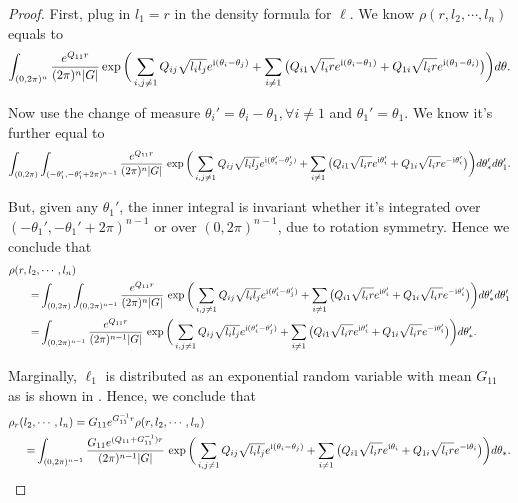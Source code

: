 \documentclass[a4paper, 11pt]{article}
\newcommand{\compi}{\textnormal{i}}
\begin{document}
\begin{proof}
First, plug in $l_1=r$ in the density formula for $\ell$. We know $\rho(r, l_2,\cdots, l_n)$ equals to
\[\int_{(0,2\pi)^n}\frac{e^{Q_{11}r}}{(2\pi)^n|G|} \exp\bigg(\sum_{i,j\neq 1} Q_{ij}\sqrt{l_i l_j}e^{\compi (\theta_i-\theta_j)}
+\sum_{i\neq 1}\big(Q_{i1}\sqrt{l_i r}e^{\compi(\theta_i-\theta_1)}+Q_{1i}\sqrt{l_i r}e^{\compi(\theta_1-\theta_i)}\big)
\bigg)d\theta.
\]

Now use the change of measure $\theta_i'=\theta_i-\theta_1, \forall i\neq 1$ and $\theta_1'=\theta_1$. We know it's further equal to
\[\int_{(0,2\pi)}\int_{(-\theta_1',-\theta_1'+2\pi)^{n-1}}\frac{e^{Q_{11}r}}{(2\pi)^n|G|}\, \exp\bigg(\sum_{i,j\neq 1} Q_{ij}\sqrt{l_i l_j}e^{\compi (\theta_i'-\theta_j')}
+\sum_{i\neq 1}\big(Q_{i1}\sqrt{l_i r}e^{\compi\theta_i'} +Q_{1i}\sqrt{l_i r}e^{-\compi\theta_i'}\big)
\bigg)d\theta_*'d\theta_1'.\]

But, given any $\theta_1'$, the inner integral is invariant whether it's integrated over $(-\theta_1',-\theta_1'+2\pi)^{n-1}$ or over $(0,2\pi)^{n-1}$, due to rotation symmetry. Hence we conclude that
\begin{equation*}
\begin{aligned}
\rho(r,l_2,& \cdots,l_n)\\
=& \int_{(0,2\pi)}\int_{(0,2\pi)^{n-1}}\frac{e^{Q_{11}r}}{(2\pi)^n|G|}\, \exp\bigg(\sum_{i,j\neq 1} Q_{ij}\sqrt{l_i l_j}e^{\compi (\theta_i'-\theta_j')}
+\sum_{i\neq 1}\big(Q_{i1}\sqrt{l_i r}e^{\compi \theta_i'}+Q_{1i}\sqrt{l_i r}e^{-\compi \theta_i'}\big)
\bigg)d\theta_*'d\theta_1'\\
=& \int_{(0,2\pi)^{n-1}}\frac{e^{Q_{11}r}}{(2\pi)^{n-1}|G|}\, \exp\bigg(\sum_{i,j\neq 1} Q_{ij}\sqrt{l_i l_j}e^{\compi (\theta_i'-\theta_j')}
+\sum_{i\neq 1}\big(Q_{i1}\sqrt{l_i r}e^{\compi \theta_i'}+Q_{1i}\sqrt{l_i r}e^{-\compi \theta_i'}\big)
\bigg)d\theta_*'.\\
\end{aligned}
\end{equation*}

Marginally, $\ell_1$ is distributed as an exponential random variable with mean $G_{11}$ as is shown in \cite{ek07}. Hence, we conclude that
\begin{equation*}
\begin{aligned}
\rho_r(l_2, & \cdots, l_n)
=G_{11}e^{G_{11}^{-1}r}\rho(r, l_2,\cdots, l_n) \\
=& \int_{(0,2\pi)^{n-1}}\frac{G_{11} e^{(Q_{11}+G_{11}^{-1})r}}{(2\pi)^{n-1}|G|}\, \exp\bigg(\sum_{i,j\neq 1} Q_{ij}\sqrt{l_i l_j}e^{\compi (\theta_i-\theta_j)}
+\sum_{i\neq 1}\big(Q_{i1}\sqrt{l_i r}e^{\compi \theta_i}+Q_{1i}\sqrt{l_i r}e^{-\compi \theta_i}\big)
\bigg)d\theta_*.\\
\end{aligned}
\end{equation*}


\end{proof}
\end{document}
